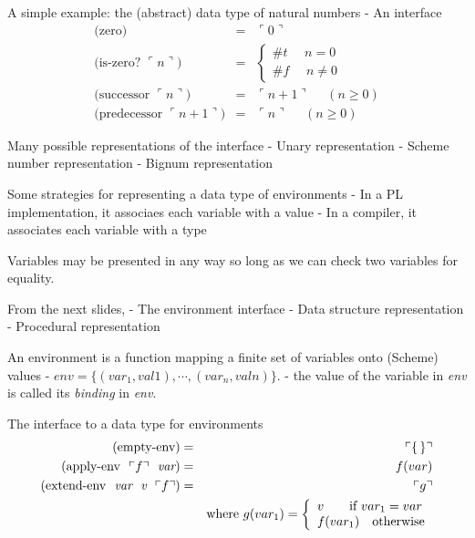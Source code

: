 \documentclass{article}
\newcommand{\rep}[1]{\ulcorner #1 \urcorner}
\begin{document}
\begin{huge}
A simple example: the (abstract) data type of natural numbers \al
- An interface
\begin{eqnarray*}
\mbox{(zero)} &=& \rep{0} 
\\
\mbox{(is-zero? $\rep{n}$)} & = &
	\left \{
	\begin{array}{l}
	\#t \ \ \ \ \ \ n = 0 \\
	\#f \ \ \ \ \ \ n \not=0
	\end{array}
	\right . 
\\
\mbox{(successor $\rep{n}$)} & = & 
\rep{n+1} \ \ \ \ \ \ (n\geq 0) 
\\
\mbox{(predecessor $\rep{n+1}$)} & = & 
\rep{n} \ \ \ \ \ \ (n\geq 0)  
\end{eqnarray*}

Many possible representations of the interface \al
- Unary representation \al
- Scheme number representation \al
- Bignum representation


Some strategies for representing a data type of environments \al
- In a PL implementation, it associaes each variable with a value  \al
- In a compiler, it associates each variable with a type \al

Variables may be presented in any way so long as we can check two variables for equality. \al

From the next slides, \al
- The environment interface \al
- Data structure representation \al
- Procedural representation 


An environment is a function mapping a finite set of variables onto (Scheme) values \al
- $env = \{ (var_1,val1), \cdots, (var_n, valn) \}$. \al
- the value of the variable in {\it env} is called its {\it binding} in {\it env}.

The interface to a data type for environments \al
\begin{eqnarray*}
\mbox{(empty-env)} &=& \rep{\emptyset} 
\\
\mbox{(apply-env \ $\rep{f}$ \ {\it var})} &=& f(var)
\\
\mbox{(extend-env \ {\it var} \ {\it v} \ $\rep{f}$)} &=& \rep{g}
\\
& & \mbox{where} \ g(var_1) =
\left \{
\begin{array}{l}
v \ \ \ \ \ \ \mbox{if} \ var_1=var 
\\
f(var_1) \ \ \ \mbox{otherwise}
\end{array}
\right .
\end{eqnarray*}


\end{huge}
\end{document}
